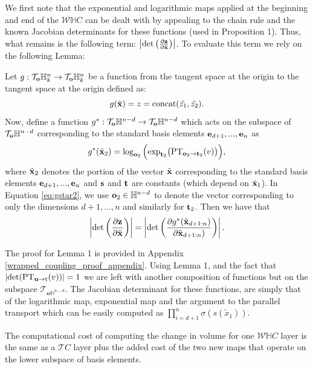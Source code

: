 \begin{proofsketch}
We first note that the exponential and logarithmic maps applied at the beginning and end of the $\mathcal{W}\mathbb{H}C$ can be dealt with by appealing to the chain rule and the known Jacobian determinants for these functions (used in Proposition 1).  
Thus, what remains is the following term: $\left|\textrm{det}\left(\frac{\partial \mathbf{z}}{\partial \tilde{\mathbf{x}}}\right)\right|$. To evaluate this term we rely on the following Lemma:
\begin{lemma}
Let $g : \mathcal{T}_{\mathbf{o}}\mathbb{H}^n_k \rightarrow \mathcal{T}_{\mathbf{o}}\mathbb{H}^n_k$ be a function from the tangent space at the origin to the tangent space at the origin defined as:
\begin{equation}\label{eq:g2}
g(\tilde{\mathbf{x}}) = z = \textnormal{concat}(\tilde{z_1}, \tilde{z_2}).
\end{equation}
Now, define a function $g^* : \mathcal{T}_{\mathbf{o}}\mathbb{H}^{n-d} \rightarrow \mathcal{T}_{\mathbf{o}}\mathbb{H}^{n-d}$ which acts on the subspace of $\mathcal{T}_{\mathbf{o}}\mathbb{H}^{n-d}$ corresponding to the standard basis elements $\mathbf{e}_{d+1}, ..., \mathbf{e}_n$ as
\begin{equation}\label{eq:gstar2}
g^*(\tilde{\mathbf{x}}_{2}) =   \log_{\mathbf{o}_{2}}\Big( \textnormal{exp}_{\mathbf{t}_{2}}\big(\textnormal{PT}_{\mathbf{o}_{2} \to \mathbf{t}_{2}}(v)\big)\Big),
\end{equation}
where $\tilde{\mathbf{x}}_{2}$ denotes the portion of the vector $\tilde{\mathbf{x}}$ corresponding to the standard basis elements $\mathbf{e}_{d+1}, ..., \mathbf{e}_n$ and $\mathbf{s}$ and $\mathbf{t}$ are constants (which depend on $\tilde{\mathbf{x}}_{1}$).
In Equation \eqref{eq:gstar2}, we use $\mathbf{o}_{2} \in \mathbb{H}^{n-d}$ to denote the vector corresponding to only the dimensions $d+1, ..., n$ and similarly for $\mathbf{t}_{2}$.
Then we have that
\begin{equation}
    \left|\textnormal{det}\left(\frac{\partial \mathbf{z}}{\partial \tilde{\mathbf{x}}}\right)\right| =    \left|\textnormal{det}\left(\frac{\partial g^*(\tilde{\mathbf{x}}_{d+1:n})}{\partial \tilde{\mathbf{x}}_{d+1:n})}\right)\right|.
\end{equation}
\end{lemma}
The proof for Lemma 1 is provided in Appendix \ref{wrapped_coupling_proof_appendix}. Using Lemma 1, and the fact that $|\textnormal{det}(\textnormal{PT}_{\textbf{u}\to\textnormal{t}}(v))| = 1$ \cite{nagano2019wrapped} we are left with another composition of functions but on the subspace $\mathcal{T}_{\textbf{o}\mathbb{H}^{n-d}}$. The Jacobian determinant for these functions, are simply that of the logarithmic map, exponential map and the argument to the parallel transport which can be easily computed as $\prod_{i=d+1}^n \sigma(s(\tilde{x}_1))$. 
\end{proofsketch}
The computational cost of computing the change in volume for one $\mathcal{W}\mathbb{H}C$ layer is the same as a $\mathcal{T}C$ layer plus the added cost of the two new maps that operate on the lower subspace of basis elements.
